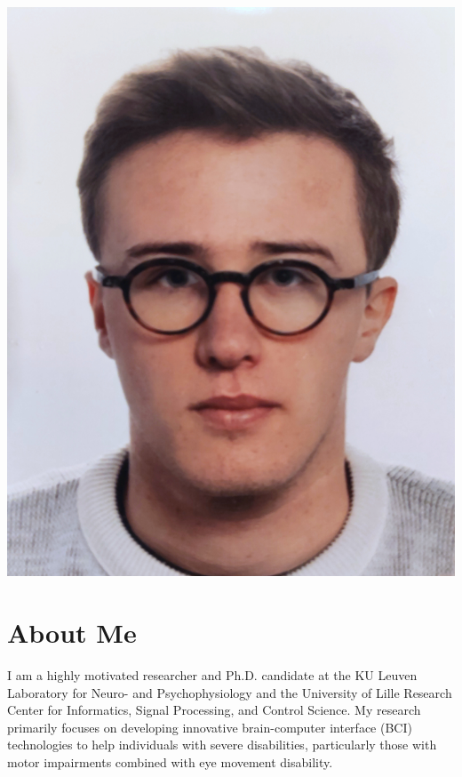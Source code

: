 \documentclass[10pt,a4paper]{article}
\begin{document}
\begin{minipage}{.25\linewidth}
	\includegraphics[width=\linewidth]{photo.jpg}
\end{minipage}


\section*{About Me}


I am a highly motivated researcher and Ph.D. candidate at the KU Leuven Laboratory for Neuro- and Psychophysiology and the University of Lille Research Center for Informatics, Signal Processing, and Control Science. My research primarily focuses on developing innovative brain-computer interface (BCI) technologies to help individuals with severe disabilities, particularly those with motor impairments combined with eye movement disability.
\end{document}

